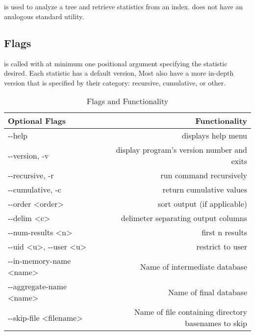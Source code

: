 \section{\gufistats}
\gufistats is used to analyze a tree and retrieve statistics from an
index. \gufistat does not have an analogous standard utility.

\subsection{Flags}
\gufistats is called with at minimum one positional argument
specifying the statistic desired. Each statistic has a default
version, Most also have a more in-depth version that is specified by
their category: recursive, cumulative, or other.

\begin{table} [h]
  \centering
  \begin{tabular}{| l | r |}
    \hline
    Optional Flags & Functionality \\
    \hline
    -{}-help & displays help menu \\
    \hline
    -{}-version, -v & display program's version number and exits \\
    \hline
    -{}-recursive, -r & run command recursively \\
    \hline
    -{}-cumulative, -c & return cumulative values \\
    \hline
    -{}-order \textless order\textgreater & sort output (if applicable) \\
    \hline
    -{}-delim \textless c\textgreater & delimeter separating output
    columns \\
    \hline
    -{}-num-results \textless n\textgreater & first n results \\
    \hline
    -{}-uid \textless u\textgreater, -{}-user \textless u\textgreater & restrict to user \\
    \hline
    -{}-in-memory-name \textless name\textgreater & Name of intermediate
    database \\
    \hline
    -{}-aggregate-name \textless name\textgreater & Name of final
    database \\
    \hline
    -{}-skip-file \textless filename\textgreater & Name of file containing
    directory basenames to skip \\
    \hline
  \end{tabular}
  \caption{\label{fig:gufi_stats_flags} \gufistats Flags and Functionality}
\end{table}

